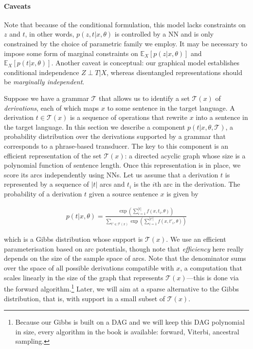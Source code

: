 \paragraph*{Caveats} Note that because of the conditional formulation,
this model lacks constraints on $z$ and $t$, in other words,
$p(z,t|x,\theta)$ is controlled by a NN and is only constrained by
the choice of parametric family we employ. It may be necessary to
impose some form of marginal constraints on $\mathbb
    E_X[p(z|x,\theta)]$ and $\mathbb E_X[p(t|x,\theta)]$. Another caveat
is conceptual: our graphical model establishes conditional
independence $Z \perp T | X$, whereas disentangled representations
should be \emph{marginally independent}.


Suppose we have a grammar $\mathcal T$ that allows us to identify a
set $\mathcal T(x)$ of \emph{derivations}, each of which maps $x$ to
some sentence in the target language. A derivation $t \in \mathcal
    T(x)$ is a sequence of operations that rewrite $x$ into a sentence in
the target language. In this section we describe a component $p(t|x,
    \theta, \mathcal T)$, a probability distribution over the derivations
supported by a grammar that corresponds to a phrase-based transducer.
The key to this component is an efficient representation of the set
$\mathcal T(x)$: a directed acyclic graph whose size is a polynomial
function of sentence length. Once this representation is in place, we
score its arcs independently using NNs. Let us assume that a
derivation $t$ is represented by a sequence of $|t|$ arcs and $t_i$
is the $i$th arc in the derivation. The probability of a derivation
$t$ given a source sentence $x$ is given by

\begin{align}
    p(t|x, \theta) =
    \frac
    {\exp(\sum_{i=1}^{|t|} f(x, t_i, \theta))}
    {\sum_{t' \in \mathcal T(x)}
        \exp(\sum_{i=1}^{|t'|} f(x, t'_i, \theta))
    }
\end{align}

\noindent which is a Gibbs distribution whose support is $\mathcal
    T(x)$. We use an efficient parameterisation based on arc potentials,
though note that \emph{efficiency} here really depends on the size of
the sample space of arcs. Note that the denominator sums over the
space of all possible derivations compatible with $x$, a computation
that scales linearly in the size of the graph that represents
$\mathcal T(x)$---this is done via the forward
algorithm.\footnote{Because our Gibbs is built on a DAG and we will
    keep this DAG polynomial in size, every algorithm in the book is
    available: forward, Viterbi, ancestral sampling.} Later, we
will aim at a sparse alternative to the Gibbs distribution, that is,
with support in a small subset of $\mathcal T(x)$.

